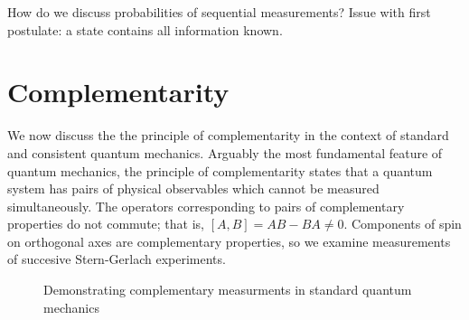 How do we discuss probabilities of sequential measurements?
Issue with first postulate: a state contains all information known.

\chapter{Complementarity}
We now discuss the the principle of complementarity in the context of standard and consistent quantum mechanics. Arguably the most fundamental feature of quantum mechanics, the principle of complementarity states that a quantum system has pairs of physical observables which cannot be measured simultaneously. The operators corresponding to pairs of complementary properties do not commute; that is, $[A,B] = AB - BA \neq 0$. Components of spin on orthogonal axes are complementary properties, so we examine measurements of succesive Stern-Gerlach experiments.

\begin{figure}
\centering\CaptionFontSize
{}
\caption[Insert an abbreviated caption here to show in the List of Figures]
{Demonstrating complementary measurments in standard quantum mechanics}
\label{Figure:Intro:FigureExampleC}
\end{figure}

